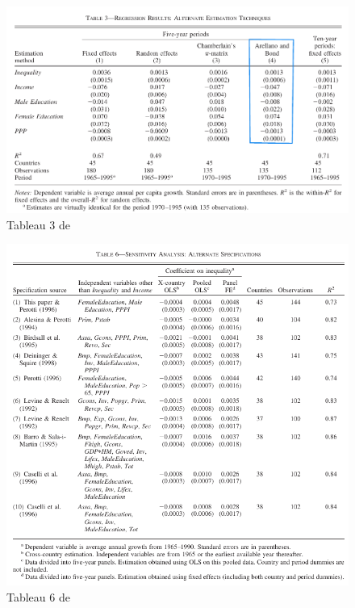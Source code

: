 \documentclass[11pt,a4paper]{article}
\begin{document}
\begin{figure}[h!]
\begin{center}
\includegraphics[scale=0.6]{forbes_tableau_3.png}
\caption{Tableau 3 de \cite{forbes}}
\label{tableau_3}
\end{center}
\end{figure}

\begin{figure}[h!]
\begin{center}
\includegraphics[scale=0.6]{forbes_tableau_6.png}
\caption{Tableau 6 de \cite{forbes}}
\label{tableau_6}
\end{center}
\end{figure}
\end{document}
